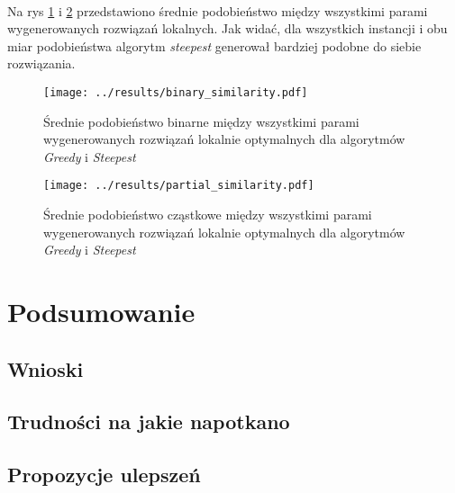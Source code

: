 \documentclass{article}
\begin{document}
	\\Na rys \ref{fig:bin_sim} i \ref{fig:part_sim} przedstawiono średnie podobieństwo między wszystkimi parami wygenerowanych rozwiązań lokalnych. Jak widać, dla wszystkich instancji i obu miar podobieństwa algorytm \emph{steepest} generował bardziej podobne do siebie rozwiązania.
			\begin{figure}[h]
				\texttt{[image: ../results/binary\_similarity.pdf]}
				\caption{Średnie podobieństwo binarne między wszystkimi parami wygenerowanych rozwiązań lokalnie optymalnych dla algorytmów \emph{Greedy} i \emph{Steepest}\label{fig:bin_sim}}		
			\end{figure}				
			\begin{figure}[h]
				\texttt{[image: ../results/partial\_similarity.pdf]}
				\caption{Średnie podobieństwo cząstkowe między wszystkimi parami wygenerowanych rozwiązań lokalnie optymalnych dla algorytmów \emph{Greedy} i \emph{Steepest}\label{fig:part_sim}}		
			\end{figure}	
		
\section{Podsumowanie}
	\subsection{Wnioski}
	\subsection{Trudności na jakie napotkano}
	\subsection{Propozycje ulepszeń}




\end{document}
